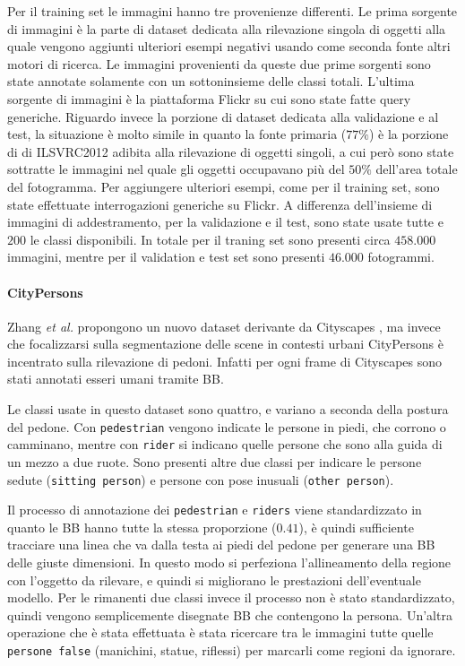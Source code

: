 Per il training set le immagini hanno tre provenienze differenti. Le prima sorgente di immagini è la parte di dataset dedicata alla rilevazione singola di oggetti alla quale vengono aggiunti ulteriori esempi negativi usando come seconda fonte altri motori di ricerca. Le immagini provenienti da queste due prime sorgenti sono state annotate solamente con un sottoninsieme delle classi totali. L'ultima sorgente di immagini è la piattaforma Flickr su cui sono state fatte query generiche. 
Riguardo invece la porzione di dataset dedicata alla validazione e al test, la situazione è molto simile in quanto la fonte primaria ($77\%$) è la porzione di di \ac{ILSVRC}2012 adibita alla rilevazione di oggetti singoli, a cui però sono state sottratte le immagini nel quale gli oggetti occupavano più del $50\%$ dell'area totale del fotogramma. Per aggiungere ulteriori esempi, come per il training set, sono state effettuate interrogazioni generiche su Flickr. A differenza dell'insieme di immagini di addestramento, per la validazione e il test, sono state usate tutte e $200$ le classi disponibili. 
In totale per il traning set sono presenti circa $458.000$ immagini, mentre per il validation e test set sono presenti $46.000$ fotogrammi.

\paragraph{CityPersons} Zhang \textit{et al. } \cite{zhang2017citypersons} propongono un nuovo dataset derivante da Cityscapes \cite{cordts2016cityscapes}, ma invece che focalizzarsi sulla segmentazione delle scene in contesti urbani CityPersons è incentrato sulla rilevazione di pedoni. Infatti per ogni frame di Cityscapes sono stati annotati esseri umani tramite \ac{BB}.

Le classi usate in questo dataset sono quattro, e variano a seconda della postura del pedone. Con \texttt{pedestrian} vengono indicate le persone in piedi, che corrono o camminano, mentre con \texttt{rider} si indicano quelle persone che sono alla guida di un mezzo a due ruote. Sono presenti altre due classi per indicare le persone sedute (\texttt{sitting person}) e persone con pose inusuali (\texttt{other person}).

Il processo di annotazione dei \texttt{pedestrian} e \texttt{riders} viene standardizzato in quanto le \ac{BB} hanno tutte la stessa proporzione ($0.41$), è quindi sufficiente tracciare una linea che va dalla testa ai piedi del pedone per generare una \ac{BB} delle giuste dimensioni. In questo modo si perfeziona l'allineamento della regione con l'oggetto da rilevare, e quindi si migliorano le prestazioni dell'eventuale modello. 
Per le rimanenti due classi invece il processo non è stato standardizzato, quindi vengono semplicemente disegnate \ac{BB} che contengono la persona. Un'altra operazione che è stata effettuata è stata ricercare tra le immagini tutte quelle \texttt{persone false} (manichini, statue, riflessi) per marcarli come regioni da ignorare. 

